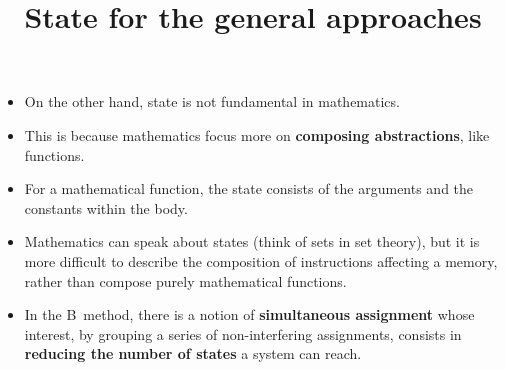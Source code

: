 \documentclass[wide]{slides}
\begin{document}
\begin{slide}
  \title{State for the general approaches}

  \begin{itemize}

    \item On the other hand, state is not fundamental in mathematics.

    \item This is because mathematics focus more on \textbf{composing
      abstractions}, like functions.

    \item For a mathematical function, the state consists of the
      arguments and the constants within the body.

    \item Mathematics can speak about states (think of sets in set
      theory), but it is more difficult to describe the composition of
      instructions affecting a memory, rather than compose purely
      mathematical functions.

    \item In the B~method, there is a notion of \textbf{simultaneous
      assignment} whose interest, by grouping a series of
      non-interfering assignments, consists in \textbf{reducing the
        number of states} a system can reach.


  \end{itemize}

\end{slide}
\end{document}
